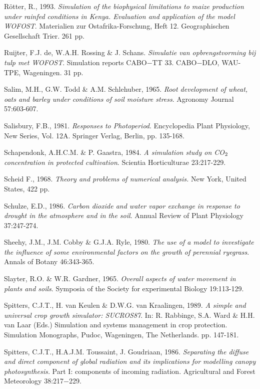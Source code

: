 R\"{o}tter, R., 1993. {\it Simulation of the biophysical limitations to maize production under rainfed
conditions in Kenya. Evaluation and application of the model WOFOST\/}. {\nobreak}Materialien zur Ostafrika-Forschung, 
Heft 12. {\nobreak}Geographischen Gesellschaft Trier. 261 pp.

Ruijter, F.J. de, W.A.H. Rossing \& J. Schans. {\it Simulatie van opbrengstvorming bij tulp met
WOFOST\/}. Simula\-tion reports CABO$-$TT 33. CABO$-$DLO, WAU-TPE, Wageningen. 31 pp.

Salim, M.H., G.W. Todd \& A.M. Schlehuber, 1965. {\it Root development of wheat, oats and barley
under conditions of soil moisture stress\/}. Agronomy Journal 57:603-607.

Salisbury, F.B., 1981. {\it Responses to Photoperiod\/}. Encyclopedia Plant Physiology, New Series, Vol.
12A. Springer Verlag, Berlin, pp. 135-168.

Schapendonk, A.H.C.M. \& P. Gaastra, 1984. {\it A simulation study on CO$_{{\rm 2}}$ concentration in protected
cultivation\/}. Scientia Horticulturae 23:217-229.

Scheid F., 1968. {\it Theory and problems of numerical analysis.\/} New York, United States, 422 pp.

Schulze, E.D., 1986. {\it Carbon dioxide and water vapor exchange in response to drought in the
atmosphere and in the soil\/}. Annual Review of Plant Physiology 37:247-274.

Sheehy, J.M., J.M. Cobby \& G.J.A. Ryle, 1980. {\it The use of a model to investigate the influence of
some environmental factors on the growth of perennial ryegrass\/}. Annals of Botany 46:343-365.

Slayter, R.O. \& W.R. Gardner, 1965. {\it Overall aspects of water movement in plants and soils\/}.
Symposia of the Society for experimental Biology 19:113-129.

Spitters, C.J.T., H. van Keulen \& D.W.G. van Kraalingen, 1989. {\it A simple and universal crop
growth simulator: SUCROS87\/}. In: R. Rabbinge, S.A. Ward \& H.H. van Laar (Eds.) Simulation and
systems management in crop protection. Simulation Monographs, Pudoc, Wageningen, The
Netherlands. pp. 147-181.

Spitters, C.J.T., H.A.J.M. Toussaint, J. Goudriaan, 1986. {\it Separating the diffuse and direct
component of global radiation and its implications for modelling canopy photosynthesis.\/} Part I:
components of incoming radiation. Agricultural and Forest Meteorology 38:217$-$229. 

